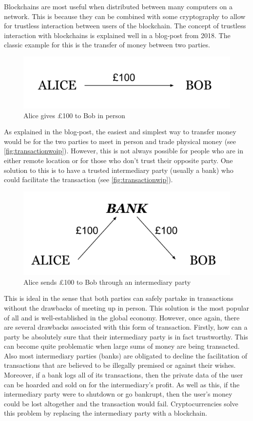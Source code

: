 \documentclass{article}
\begin{document}
Blockchains are most useful when distributed between many computers on a network. This is because they can be combined with some cryptography to allow for trustless interaction between users of the blockchain. The concept of trustless interaction with blockchains is explained well in a blog-post from 2018\cite{medium_trustless_blockchain}. The classic example for this is the transfer of money between two parties. 
\begin{figure}[h]
    \centering
    \includegraphics[width=0.65\linewidth]{Images/Diagrams/transaction_in_person.png}
    \caption{Alice gives £100 to Bob in person}
    \label{fig:transactionwoip}
\end{figure}
As explained in the blog-post, the easiest and simplest way to transfer money would be for the two parties to meet in person and trade physical money (see \autoref{fig:transactionwoip}). However, this is not always possible for people who are in either remote location or for those who don't trust their opposite party. One solution to this is to have a trusted intermediary party (usually a bank) who could facilitate the transaction (see \autoref{fig:transactionwip}). 
\begin{figure}[h]
    \centering
    \includegraphics[width=0.65\linewidth]{Images/Diagrams/transaction_with_intermediary.png}
    \caption{Alice sends £100 to Bob through an intermediary party}
    \label{fig:transactionwip}
\end{figure}
This is ideal in the sense that both parties can safely partake in transactions without the drawbacks of meeting up in person. This solution is the most popular of all and is well-established in the global economy. However, once again, there are several drawbacks associated with this form of transaction. Firstly, how can a party be absolutely sure that their intermediary party is in fact trustworthy. This can become quite problematic when large sums of money are being transacted. Also most intermediary parties (banks) are obligated to decline the facilitation of transactions that are believed to be illegally premised or against their wishes. Moreover, if a bank logs all of its transactions, then the private data of the user can be hoarded and sold on for the intermediary's profit. As well as this, if the intermediary party were to shutdown or go bankrupt, then the user's money could be lost altogether and the transaction would fail. Cryptocurrencies solve this problem by replacing the intermediary party with a blockchain.
\end{document}
